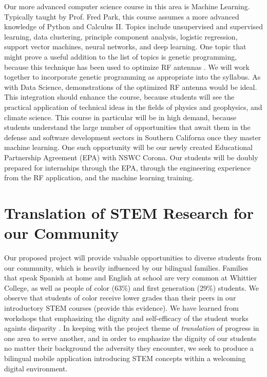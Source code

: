 \documentclass[../../main.tex]{subfiles}
\begin{document}
Our more advanced computer science course in this area is Machine Learning.  Typically taught by Prof. Fred Park, this course assumes a more advanced knowledge of Python and Calculus II.  Topics include unsupervised and supervised learning, data clustering, principle component analysis, logistic regression, support vector machines, neural networks, and deep learning.  One topic that might prove a useful addition to the list of topics is genetic programming, because this technique has been used to optimize RF antennas \cite{2016MsT.........58S,genetic}.  We will work together to incorporate genetic programming as appropriate into the syllabus.  As with Data Science, demonstrations of the optimized RF antenna would be ideal.  This integration should enhance the course, because students will see the practical application of technical ideas in the fields of physics and geophysics, and climate science.  This course in particular will be in high demand, because students understand the large number of opportunities that await them in the defense and software development sectors in Southern Californa once they master machine learning.  One such opportunity will be our newly created Educational Partnership Agreement (EPA) with NSWC Corona.  Our students will be doubly prepared for internships through the EPA, through the engineering experience from the RF application, and the machine learning training.

\section{Translation of STEM Research for our Community}

Our proposed project will provide valuable opportunities to diverse students from our community, which is heavily influenced by our bilingual families.  Families that speak Spanish at home and English at school are very common at Whittier College, as well as people of color (63\%) and first generation (29\%) students.  We observe that students of color receive lower grades than their peers in our introductory STEM courses (provide this evidence).  We have learned from workshops that emphasizing the dignity and self-efficacy of the student works againts disparity \cite{cottrell1,cottrell2}.  In keeping with the project theme of \textit{translation} of progress in one area to serve another, and in order to emphasize the dignity of our students no matter their background the adversity they encounter, we seek to produce a bilingual mobile application introducing STEM concepts within a welcoming digital environment. \\ \vspace{2.5mm}
\end{document}
